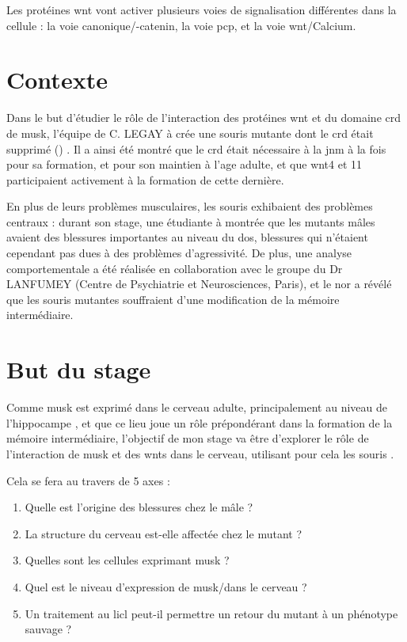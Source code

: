 	Les protéines \gls{wnt} vont activer plusieurs voies de signalisation différentes dans la cellule :  la voie canonique/\textbeta-catenin, la voie \gls{pcp}, et la voie \gls{wnt}/Calcium. 

\section{Contexte}
	\label{sec:Contexte}
	
	Dans le but d'étudier le rôle de l'interaction des protéines \gls{wnt} et du domaine \gls{crd} de \gls{musk}, l'équipe de C. LEGAY à crée une souris mutante dont le \gls{crd} était supprimé (\mcrd) \cite{Messeant2015, Messeant2017}. Il a ainsi été montré que le \gls{crd} était nécessaire à la \gls{jnm} à la fois pour sa formation, et pour son maintien à l'age adulte, et que \gls{wnt}4 et 11 participaient activement à la formation de cette dernière.
	
	En plus de leurs problèmes musculaires, les souris \mcrd exhibaient des problèmes centraux : durant son stage, une étudiante à montrée que les mutants mâles avaient des blessures importantes au niveau du dos, blessures qui n'étaient cependant pas dues à des problèmes d'agressivité. De plus, une analyse comportementale a été réalisée en collaboration avec le groupe du Dr LANFUMEY (Centre de Psychiatrie et Neurosciences, Paris), et le \gls{nor} a révélé que les souris mutantes souffraient d'une modification de la mémoire intermédiaire.
		
\section{But du stage}
\label{sec:IntroBut}

Comme \gls{musk} est exprimé dans le cerveau adulte, principalement au niveau de l'hippocampe \cite{Garcia-Osta2006}, et que ce lieu joue un rôle prépondérant dans la formation de la mémoire intermédiaire, l'objectif de mon stage va être d'explorer le rôle de l'interaction de \gls{musk} et des \glspl{wnt} dans le cerveau, utilisant pour cela les souris \mcrd.

Cela se fera au travers de 5 axes : 
\begin{enumerate}
	\item Quelle est l'origine des blessures chez le mâle ?
	\item La structure du cerveau est-elle affectée chez le mutant ?
	\item Quelles sont les cellules exprimant \gls{musk} ?
	\item Quel est le niveau d'expression de \gls{musk}/\mcrd dans le cerveau ?
	\item Un traitement au \gls{licl} peut-il permettre un retour du mutant à un phénotype sauvage ?
\end{enumerate}